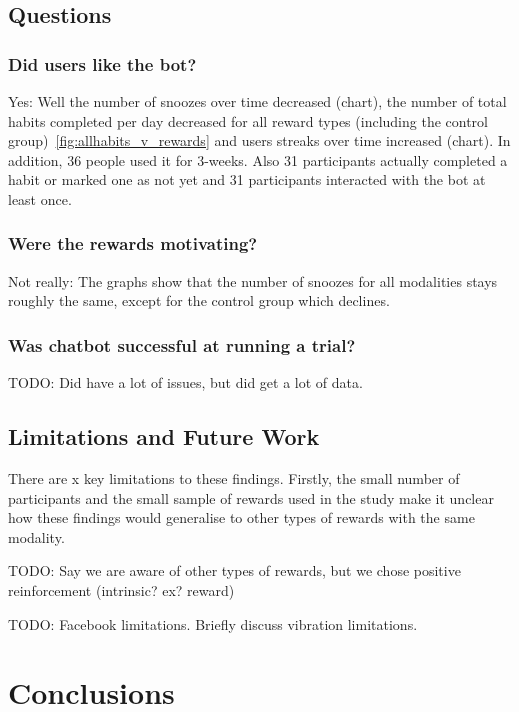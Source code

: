 \documentclass{scaffold/sigchi}
\begin{document}
\subsection{Questions}
\subsubsection{Did users like the bot?}
Yes: Well the number of snoozes over time decreased (chart), the number of total habits completed per day decreased for all reward types (including the control group)~\ref{fig:allhabits_v_rewards} and users streaks over time increased (chart). In addition, 36 people used it for 3-weeks. Also 31 participants actually completed a habit or marked one as not yet and 31 participants interacted with the bot at least once.




\subsubsection{Were the rewards motivating?}
Not really: The graphs show that the number of snoozes for all modalities stays roughly the same, except for the control group which declines.


\subsubsection{Was chatbot successful at running a trial?}
TODO: Did have a lot of issues, but did get a lot of data.


\subsection{Limitations and Future Work}
There are x key limitations to these findings. Firstly, the small number of participants and the small sample of rewards used in the study make it unclear how these findings would generalise to other types of rewards with the same modality.

TODO: Say we are aware of other types of rewards, but we chose positive reinforcement (intrinsic? ex? reward)

TODO: Facebook limitations. Briefly discuss vibration limitations.





\section{Conclusions}
\end{document}
